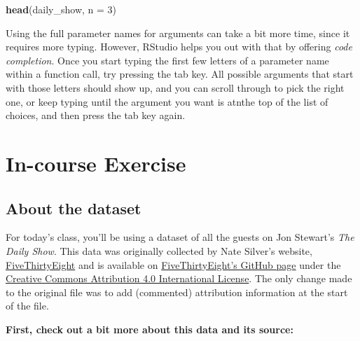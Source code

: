 \documentclass[]{book}
\makeatletter
\newenvironment{Shaded}{\begin{snugshade}}{\end{snugshade}}
\newcommand{\KeywordTok}[1]{\textcolor[rgb]{0.13,0.29,0.53}{\textbf{{#1}}}}
\newcommand{\DataTypeTok}[1]{\textcolor[rgb]{0.13,0.29,0.53}{{#1}}}
\newcommand{\DecValTok}[1]{\textcolor[rgb]{0.00,0.00,0.81}{{#1}}}
\newcommand{\NormalTok}[1]{{#1}}
\newenvironment{kframe}{%
\medskip{}
\setlength{\fboxsep}{.8em}
 \def\at@end@of@kframe{}%
 \ifinner\ifhmode%
  \def\at@end@of@kframe{\end{minipage}}%
  \begin{minipage}{\columnwidth}%
 \fi\fi%
 \def\FrameCommand##1{\hskip\@totalleftmargin \hskip-\fboxsep
 \colorbox{shadecolor}{##1}\hskip-\fboxsep
     \hskip-\linewidth \hskip-\@totalleftmargin \hskip\columnwidth}%
 \MakeFramed {\advance\hsize-\width
   \@totalleftmargin\z@ \linewidth\hsize
   \@setminipage}}%
 {\par\unskip\endMakeFramed%
 \at@end@of@kframe}
\renewenvironment{Shaded}{\begin{kframe}}{\end{kframe}}
\newenvironment{rmdblock}[1]
  {
  \begin{itemize}
  \renewcommand{\labelitemi}{
    \raisebox{-.7\height}[0pt][0pt]{
      {\setkeys{Gin}{width=3em,keepaspectratio}\texttt{[image: images/\#1]}}
    }
  }
  \setlength{\fboxsep}{1em}
  \begin{kframe}
  \item
  }
  {
  \end{kframe}
  \end{itemize}
  }
\newenvironment{rmdtip}
  {\begin{rmdblock}{tip}}
  {\end{rmdblock}}
\makeatother
\begin{document}
\begin{Shaded}
\begin{Highlighting}[]
\KeywordTok{head}\NormalTok{(daily_show, }\DataTypeTok{n =} \DecValTok{3}\NormalTok{)}
\end{Highlighting}
\end{Shaded}

\begin{rmdtip}
Using the full parameter names for arguments can take a bit more time,
since it requires more typing. However, RStudio helps you out with that
by offering \emph{code completion}. Once you start typing the first few
letters of a parameter name within a function call, try pressing the tab
key. All possible arguments that start with those letters should show
up, and you can scroll through to pick the right one, or keep typing
until the argument you want is atnthe top of the list of choices, and
then press the tab key again.
\end{rmdtip}

\section{In-course Exercise}\label{in-course-exercise}

\subsection{About the dataset}\label{about-the-dataset}

For today's class, you'll be using a dataset of all the guests on Jon
Stewart's \emph{The Daily Show}. This data was originally collected by
Nate Silver's website,
\href{http://fivethirtyeight.com}{FiveThirtyEight} and is available on
\href{https://github.com/fivethirtyeight/data/tree/master/daily-show-guests}{FiveThirtyEight's
GitHub page} under the
\href{http://creativecommons.org/licenses/by/4.0/}{Creative Commons
Attribution 4.0 International License}. The only change made to the
original file was to add (commented) attribution information at the
start of the file.

\textbf{First, check out a bit more about this data and its source:}
\end{document}
